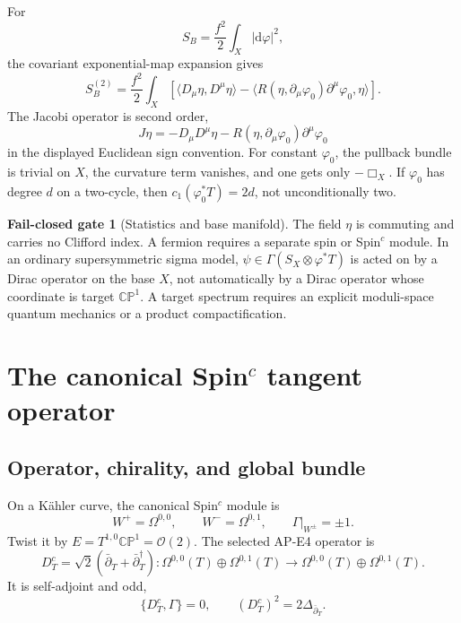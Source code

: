 \documentclass[11pt]{article}
\theoremstyle{definition}
\newtheorem{gate}[theorem]{Fail-closed gate}
\theoremstyle{remark}
\newcommand{\dd}{\mathrm d}
\newcommand{\CP}{\mathbb {CP}}
\newcommand{\cO}{\mathcal O}
\begin{document}
For
\begin{equation}
 S_B=\frac{f^2}{2}\int_X|\dd\varphi|^2,
 \label{eq:bosonic-action}
\end{equation}
the covariant exponential-map expansion gives
\begin{equation}
 S_B^{(2)}=\frac{f^2}{2}\int_X
 \left[
 \langle D_\mu\eta,D^\mu\eta\rangle
 -\langle R(\eta,\partial_\mu\varphi_0)
 \partial^\mu\varphi_0,\eta\rangle
 \right].
 \label{eq:jacobi-hessian}
\end{equation}
The Jacobi operator is second order,
\begin{equation}
 J\eta=-D_\mu D^\mu\eta
 -R(\eta,\partial_\mu\varphi_0)\partial^\mu\varphi_0
 \label{eq:jacobi-operator}
\end{equation}
in the displayed Euclidean sign convention.  For constant \(\varphi_0\), the
pullback bundle is trivial on \(X\), the curvature term vanishes, and one gets
only \(-\Box_X\).  If \(\varphi_0\) has degree \(d\) on a two-cycle, then
\(c_1(\varphi_0^*T)=2d\), not unconditionally two.

\begin{gate}[Statistics and base manifold]
The field \(\eta\) is commuting and carries no Clifford index.  A fermion
requires a separate spin or Spin\({}^c\) module.  In an ordinary supersymmetric
sigma model, \(\psi\in\Gamma(S_X\otimes\varphi^*T)\) is acted on by a Dirac
operator on the base \(X\), not automatically by a Dirac operator whose
coordinate is target \(\CP^1\).  A target spectrum requires an explicit
moduli-space quantum mechanics or a product compactification.
\end{gate}

\section{The canonical Spin\texorpdfstring{\({}^c\)}{c} tangent operator}

\subsection{Operator, chirality, and global bundle}

On a K\"ahler curve, the canonical Spin\({}^c\) module is
\cite{LawsonMichelsohn1989,Wells2008}
\begin{equation}
 W^+=\Omega^{0,0},\qquad W^-=\Omega^{0,1},
 \qquad \Gamma|_{W^\pm}=\pm1.
 \label{eq:canonical-module}
\end{equation}
Twist it by
\(E=T^{1,0}\CP^1=\cO(2)\).  The selected AP-E4 operator is
\begin{equation}
 \boxed{
 D_T^c=\sqrt2(\bar\partial_T+\bar\partial_T^\dagger):
 \Omega^{0,0}(T)\oplus\Omega^{0,1}(T)
 \longrightarrow
 \Omega^{0,0}(T)\oplus\Omega^{0,1}(T).}
 \label{eq:canonical-dirac}
\end{equation}
It is self-adjoint and odd,
\begin{equation}
 \{D_T^c,\Gamma\}=0,
 \qquad (D_T^c)^2=2\Delta_{\bar\partial_T}.
 \label{eq:dirac-square}
\end{equation}
\end{document}
